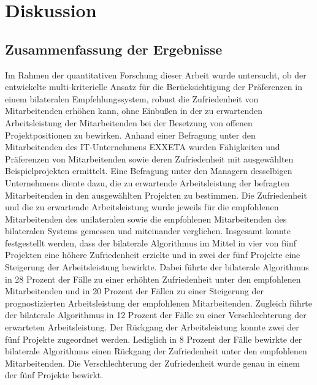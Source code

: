 
\chapter{Diskussion}
\label{ch:diskussion}

\section{Zusammenfassung der Ergebnisse}
Im Rahmen der quantitativen Forschung dieser Arbeit wurde untersucht, ob der entwickelte multi-kriterielle Ansatz für die Berücksichtigung der Präferenzen in einem bilateralen Empfehlungssystem, robust die Zufriedenheit von Mitarbeitenden erhöhen kann, ohne Einbußen in der zu erwartenden Arbeitsleistung der Mitarbeitenden bei der Besetzung von offenen Projektpositionen zu bewirken.
Anhand einer Befragung unter den Mitarbeitenden des IT-Unternehmens EXXETA wurden Fähigkeiten und Präferenzen von Mitarbeitenden sowie deren Zufriedenheit mit ausgewählten Beispielprojekten ermittelt.
Eine Befragung unter den Managern desselbigen Unternehmens diente dazu, die zu erwartende Arbeitsleistung der befragten Mitarbeitenden in den ausgewählten Projekten zu bestimmen.
Die Zufriedenheit und die zu erwartende Arbeitsleistung wurde jeweils für die empfohlenen Mitarbeitenden des unilateralen sowie die empfohlenen Mitarbeitenden des bilateralen Systems gemessen und miteinander verglichen.
Insgesamt konnte festgestellt werden, dass der bilaterale Algorithmus im Mittel in vier von fünf Projekten eine höhere Zufriedenheit erzielte und in zwei der fünf Projekte eine Steigerung der Arbeitsleistung bewirkte.
Dabei führte der bilaterale Algorithmus in 28 Prozent der Fälle zu einer erhöhten Zufriedenheit unter den empfohlenen Mitarbeitenden und in 20 Prozent der Fällen zu einer Steigerung der prognostizierten Arbeitsleistung der empfohlenen Mitarbeitenden.
Zugleich führte der bilaterale Algorithmus in 12 Prozent der Fälle zu einer Verschlechterung der erwarteten Arbeitsleistung.
Der Rückgang der Arbeitsleistung konnte zwei der fünf Projekte zugeordnet werden.
Lediglich in 8 Prozent der Fälle bewirkte der bilaterale Algorithmus einen Rückgang der Zufriedenheit unter den empfohlenen Mitarbeitenden.
Die Verschlechterung der Zufriedenheit wurde genau in einem der fünf Projekte bewirkt.

